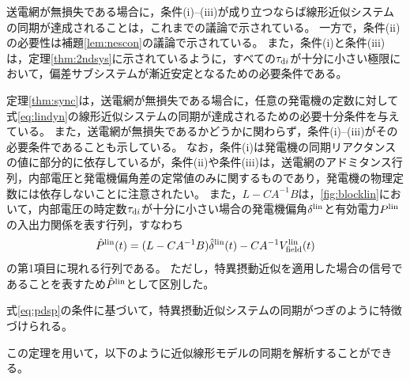 \documentclass[tombow,dvipdfmx]{corona-a5}
\begin{document}
\begin{証明}
送電網が無損失である場合に，条件(i)--(iii)が成り立つならば線形近似システムの同期が達成されることは，これまでの議論で示されている。
一方で，条件(ii)の必要性は補題\ref{lem:nescon}の議論で示されている。
また，条件(i)と条件(iii)は，定理\ref{thm:2ndsys}に示されているように，すべての$\tau_{{\rm d}i}$が十分に小さい極限において，偏差サブシステムが漸近安定となるための必要条件である。
\end{証明}

定理\ref{thm:sync}は，送電網が無損失である場合に，任意の発電機の定数に対して式\ref{eq:lindyn}の線形近似システムの同期が達成されるための必要十分条件を与えている。
また，送電網が無損失であるかどうかに関わらず，条件(i)--(iii)がその必要条件であることも示している。
なお，条件(i)は発電機の同期リアクタンスの値に部分的に依存しているが，条件(ii)や条件(iii)は，送電網のアドミタンス行列，内部電圧と発電機偏角差の定常値のみに関するものであり，発電機の物理定数には依存しないことに注意されたい。
また，$L-CA^{-1}B$は，\ref{fig:blocklin}において，内部電圧の時定数$\tau_{{\rm d}i}$が十分に小さい場合の発電機偏角$\delta^{\rm lin}$と有効電力$P^{\rm lin}$の入出力関係を表す行列，すなわち
\begin{align*}
\hat{P}^{\rm lin}(t) = (L-CA^{-1}B) \hat{\delta}^{\rm lin}(t)
- C A^{-1} V^{\rm lin}_{\rm field}(t)
\end{align*}
の第1項目に現れる行列である。
ただし，特異摂動近似を適用した場合の信号であることを表すため$\hat{P}^{\rm lin}$として区別した。



式\ref{eq:pdsp}の条件に基づいて，特異摂動近似システムの同期がつぎのように特徴づけられる。




この定理を用いて，以下のように近似線形モデルの同期を解析することができる。
\end{document}
